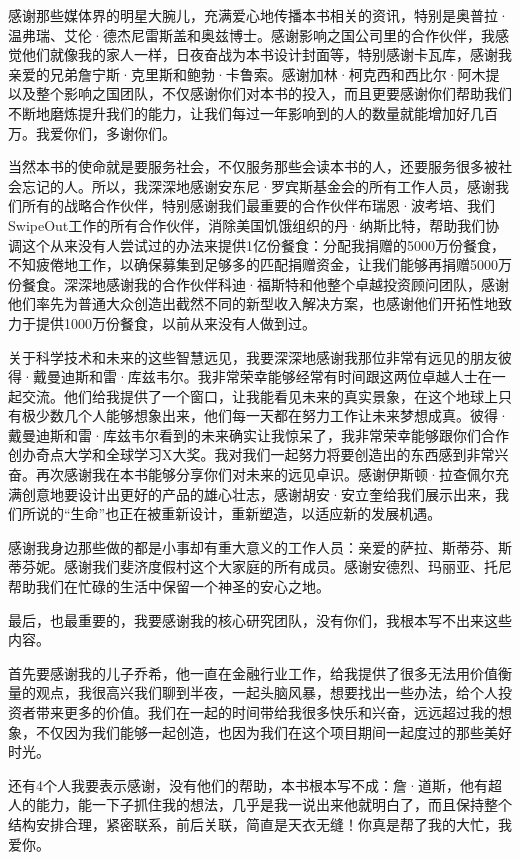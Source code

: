 感谢那些媒体界的明星大腕儿，充满爱心地传播本书相关的资讯，特别是奥普拉·温弗瑞、艾伦·德杰尼雷斯盖和奥兹博士。感谢影响之国公司里的合作伙伴，我感觉他们就像我的家人一样，日夜奋战为本书设计封面等，特别感谢卡瓦库，感谢我亲爱的兄弟詹宁斯·克里斯和鲍勃·卡鲁索。感谢加林·柯克西和西比尔·阿木提以及整个影响之国团队，不仅感谢你们对本书的投入，而且更要感谢你们帮助我们不断地磨炼提升我们的能力，让我们每过一年影响到的人的数量就能增加好几百万。我爱你们，多谢你们。

当然本书的使命就是要服务社会，不仅服务那些会读本书的人，还要服务很多被社会忘记的人。所以，我深深地感谢安东尼·罗宾斯基金会的所有工作人员，感谢我们所有的战略合作伙伴，特别感谢我们最重要的合作伙伴布瑞恩·波考培、我们SwipeOut工作的所有合作伙伴，消除美国饥饿组织的丹·纳斯比特，帮助我们协调这个从来没有人尝试过的办法来提供1亿份餐食：分配我捐赠的5000万份餐食，不知疲倦地工作，以确保募集到足够多的匹配捐赠资金，让我们能够再捐赠5000万份餐食。深深地感谢我的合作伙伴科迪·福斯特和他整个卓越投资顾问团队，感谢他们率先为普通大众创造出截然不同的新型收入解决方案，也感谢他们开拓性地致力于提供1000万份餐食，以前从来没有人做到过。

关于科学技术和未来的这些智慧远见，我要深深地感谢我那位非常有远见的朋友彼得·戴曼迪斯和雷·库兹韦尔。我非常荣幸能够经常有时间跟这两位卓越人士在一起交流。他们给我提供了一个窗口，让我能看见未来的真实景象，在这个地球上只有极少数几个人能够想象出来，他们每一天都在努力工作让未来梦想成真。彼得·戴曼迪斯和雷·库兹韦尔看到的未来确实让我惊呆了，我非常荣幸能够跟你们合作创办奇点大学和全球学习X大奖。我对我们一起努力将要创造出的东西感到非常兴奋。再次感谢我在本书能够分享你们对未来的远见卓识。感谢伊斯顿·拉查佩尔充满创意地要设计出更好的产品的雄心壮志，感谢胡安·安立奎给我们展示出来，我们所说的“生命”也正在被重新设计，重新塑造，以适应新的发展机遇。

感谢我身边那些做的都是小事却有重大意义的工作人员：亲爱的萨拉、斯蒂芬、斯蒂芬妮。感谢我们斐济度假村这个大家庭的所有成员。感谢安德烈、玛丽亚、托尼帮助我们在忙碌的生活中保留一个神圣的安心之地。

最后，也最重要的，我要感谢我的核心研究团队，没有你们，我根本写不出来这些内容。

首先要感谢我的儿子乔希，他一直在金融行业工作，给我提供了很多无法用价值衡量的观点，我很高兴我们聊到半夜，一起头脑风暴，想要找出一些办法，给个人投资者带来更多的价值。我们在一起的时间带给我很多快乐和兴奋，远远超过我的想象，不仅因为我们能够一起创造，也因为我们在这个项目期间一起度过的那些美好时光。

还有4个人我要表示感谢，没有他们的帮助，本书根本写不成：詹·道斯，他有超人的能力，能一下子抓住我的想法，几乎是我一说出来他就明白了，而且保持整个结构安排合理，紧密联系，前后关联，简直是天衣无缝！你真是帮了我的大忙，我爱你。


